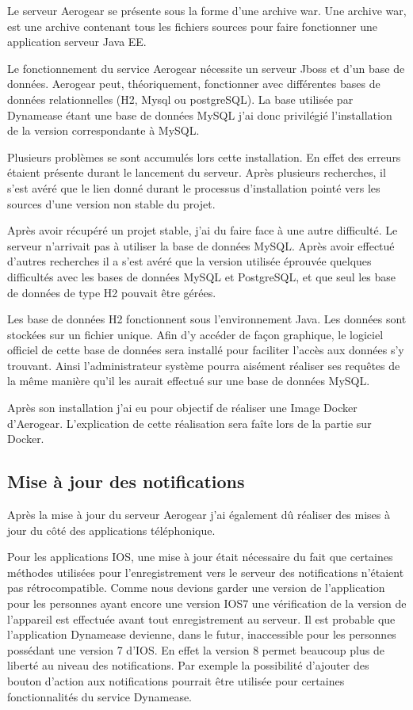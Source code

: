 Le serveur Aerogear se présente sous la forme d'une archive war. Une archive war, est une archive contenant tous les fichiers sources pour faire fonctionner une application serveur Java EE.

Le fonctionnement du service Aerogear  nécessite un serveur Jboss et d'un base de données. Aerogear peut, théoriquement, fonctionner avec différentes bases de données relationnelles (H2, Mysql ou postgreSQL). La base utilisée par Dynamease étant une base de données MySQL j'ai donc privilégié l'installation de la version correspondante à MySQL.

Plusieurs problèmes se sont accumulés lors cette installation. En effet des erreurs étaient présente durant le lancement du serveur. Après plusieurs recherches, il s'est avéré que le lien donné durant le processus d'installation pointé vers les sources d'une version non stable du projet. 

Après avoir récupéré un projet stable, j'ai du faire face à une autre difficulté. Le serveur n'arrivait pas à utiliser la base de données MySQL. Après avoir effectué d'autres recherches il a s'est avéré que la version utilisée éprouvée quelques difficultés avec les bases de données MySQL et PostgreSQL, et que seul les base de données de type H2 pouvait être gérées.

Les base de données H2 fonctionnent sous l'environnement Java. Les données sont stockées sur un fichier unique. Afin d'y accéder de façon graphique, le logiciel officiel de cette base de données sera installé pour faciliter l'accès aux données s'y trouvant. Ainsi l'administrateur système pourra aisément réaliser ses requêtes de la même manière qu'il les aurait effectué sur une base de données MySQL.

Après son installation j'ai eu pour objectif de réaliser une Image Docker d'Aerogear. L'explication de cette réalisation sera faîte lors de la partie sur Docker.

\subsection{Mise à jour des notifications}

Après la mise à jour du serveur Aerogear j'ai également dû réaliser des mises à jour du côté des applications téléphonique.

Pour les applications IOS, une mise à jour était nécessaire du fait que certaines méthodes utilisées pour l'enregistrement vers le serveur des notifications n'étaient pas rétrocompatible. Comme nous devions garder une version de l'application pour les personnes ayant encore une version IOS7 une vérification de la version de l'appareil est effectuée avant tout enregistrement au serveur. Il est probable que l'application Dynamease devienne, dans le futur, inaccessible pour les personnes possédant une version 7 d'IOS. En effet la version 8 permet beaucoup plus de liberté au niveau des notifications. Par exemple la possibilité d'ajouter des bouton d'action aux notifications pourrait être utilisée pour certaines fonctionnalités du service Dynamease.\\

